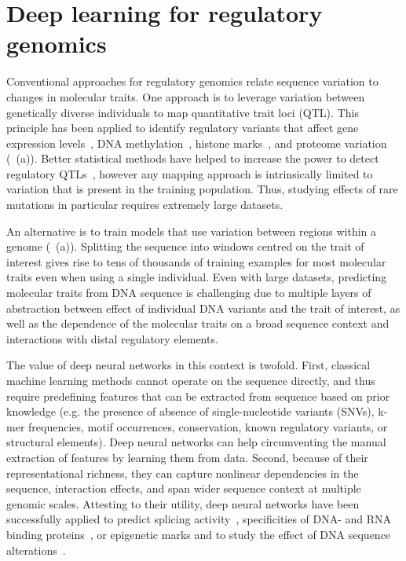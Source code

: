 \section{Deep learning for regulatory genomics} \label{sec:dl_genomics}

Conventional approaches for regulatory genomics relate sequence variation to changes in molecular traits. One approach is to leverage variation between genetically diverse individuals to map quantitative trait loci (QTL). This principle has been applied to identify regulatory variants that affect gene expression levels~\citep{montgomery_transcriptome_2010,pickrell_understanding_2010}, DNA methylation~\citep{bell_dna_2011,gibbs_abundant_2010}, histone marks~\citep{grubert_genetic_2015,waszak_population_2015}, and proteome variation~\citep{albert_genetics_2014,battle_genomic_2015,parts_heritability_2014,vincent_stacked_2010} (~(a)). Better statistical methods have helped to increase the power to detect regulatory QTLs~\citep{kang_accurate_2008,parts_joint_2011,rakitsch_modelling_2016,stegle_bayesian_2010}, however any mapping approach is intrinsically limited to variation that is present in the training population. Thus, studying effects of rare mutations in particular requires extremely large datasets.

An alternative is to train models that use variation between regions within a genome (~(a)). Splitting the sequence into windows centred on the trait of interest gives rise to tens of thousands of training examples for most molecular traits even when using a single individual. Even with large datasets, predicting molecular traits from DNA sequence is challenging due to multiple layers of abstraction between effect of individual DNA variants and the trait of interest, as well as the dependence of the molecular traits on a broad sequence context and interactions with distal regulatory elements.

The value of deep neural networks in this context is twofold. First, classical machine learning methods cannot operate on the sequence directly, and thus require predefining features that can be extracted from sequence based on prior knowledge (e.g. the presence of absence of single-nucleotide variants (SNVs), k-mer frequencies, motif occurrences, conservation, known regulatory variants, or structural elements). Deep neural networks can help circumventing the manual extraction of features by learning them from data. Second, because of their representational richness, they can capture nonlinear dependencies in the sequence, interaction effects, and span wider sequence context at multiple genomic scales. Attesting to their utility, deep neural networks have been successfully applied to predict splicing activity~\citep{leung_deep_2014,xiong_human_2015}, specificities of DNA- and RNA binding proteins~\citep{alipanahi_predicting_2015}, or epigenetic marks and to study the effect of DNA sequence alterations~\citep{kelley_basset:_2016,zhou_predicting_2015}.

